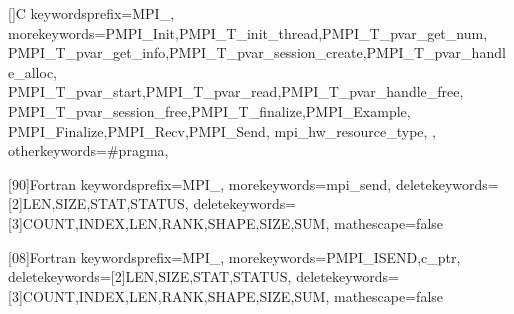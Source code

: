 


[]{C}%
{%
        keywordsprefix={MPI_},%
        morekeywords={PMPI_Init,PMPI_T_init_thread,PMPI_T_pvar_get_num,%
PMPI_T_pvar_get_info,PMPI_T_pvar_session_create,PMPI_T_pvar_handle_alloc,%
PMPI_T_pvar_start,PMPI_T_pvar_read,PMPI_T_pvar_handle_free,%
PMPI_T_pvar_session_free,PMPI_T_finalize,PMPI_Example,%
PMPI_Finalize,PMPI_Recv,PMPI_Send,%
mpi_hw_resource_type,
},%
        otherkeywords={\#pragma},
}

[90]{Fortran}%
{
        keywordsprefix={MPI_},%
        morekeywords={mpi_send},%
        deletekeywords=[2]{LEN,SIZE,STAT,STATUS},
        deletekeywords=[3]{COUNT,INDEX,LEN,RANK,SHAPE,SIZE,SUM},
        mathescape=false
}

[08]{Fortran}%
{
        keywordsprefix={MPI_},%
        morekeywords={PMPI_ISEND,c_ptr},%
        deletekeywords=[2]{LEN,SIZE,STAT,STATUS},
        deletekeywords=[3]{COUNT,INDEX,LEN,RANK,SHAPE,SIZE,SUM},
        mathescape=false
}


